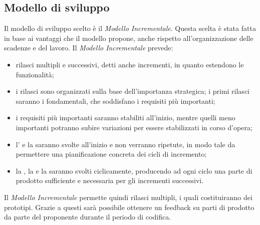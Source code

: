 \subsection{Modello di sviluppo}
Il modello di sviluppo scelto è il \textit{Modello Incrementale}. Questa scelta è stata fatta in base ai vantaggi che il modello propone, anche rispetto all'organizzazione delle scadenze e del lavoro.
Il \textit{Modello Incrementale} prevede:
\begin{itemize}
	\item rilasci multipli e successivi, detti anche incrementi, in quanto estendono le funzionalità;
	\item i rilasci sono organizzati sulla base dell'importanza strategica; i primi rilasci saranno i fondamentali, che soddisfano i requisiti più importanti;
	\item i requisiti più importanti saranno stabiliti all'inizio, mentre quelli meno importanti potranno subire variazioni per essere stabilizzati in corso d'opera;
	\item l’\AR{} e la \PA{} saranno svolte all'inizio e non verranno ripetute, in modo tale da permettere una pianificazione concreta dei cicli di incremento;
	\item la \PD{}, la \Cod{} e la \VV{} saranno svolti ciclicamente, producendo ad ogni ciclo una parte di prodotto sufficiente e necessaria per gli incrementi successivi.
\end{itemize}
Il \textit{Modello Incrementale} permette quindi rilasci multipli, i quali costituiranno dei prototipi. Grazie a questi sarà possibile ottenere un feedback su parti di prodotto da parte del proponente durante il periodo di codifica.


